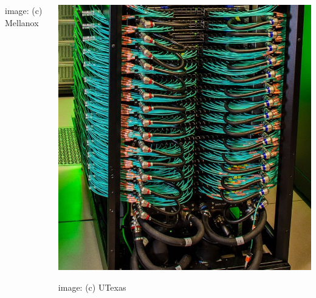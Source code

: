 \documentclass[xcolor={rgb,x11names,svgnames},rgb,x11names,svgnames]{beamer}
\begin{document}
\begin{frame}
\begin{columns}
\begin{column}{0.3\textwidth}
      \small image: (c) Mellanox
    \end{column}
    \begin{column}{0.6\textwidth}
      \includegraphics[height=0.75\textheight]{frontera_infiniband_director.jpg}

      \small image: (c) UTexas
    \end{column}
  \end{columns}
\end{frame}

\end{document}
